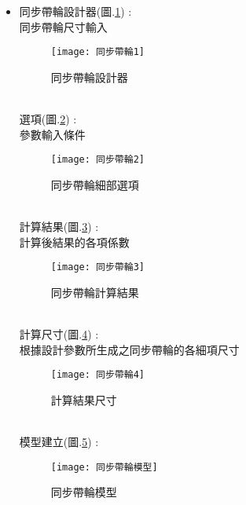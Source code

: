 \begin{itemize}
	\item 同步帶輪設計器(圖.\ref{2.61}) :\\
		同步帶輪尺寸輸入\\
		\begin{figure}[hbt!]
		\begin{center}
		\texttt{[image: 同步帶輪1]}
		\caption{\Large 同步帶輪設計器}\label{2.61}
		\end{center}
		\end{figure}
		\\
		選項(圖.\ref{2.62}) :\\
		參數輸入條件\\
		\begin{figure}[hbt!]
		\begin{center}
		\texttt{[image: 同步帶輪2]}
		\caption{\Large 同步帶輪細部選項}\label{2.62}
		\end{center}
		\end{figure}
		\\
		計算結果(圖.\ref{2.63}) :\\
		計算後結果的各項係數\\
		\begin{figure}[hbt!]
		\begin{center}
		\texttt{[image: 同步帶輪3]}
		\caption{\Large 同步帶輪計算結果}\label{2.63}
		\end{center}
		\end{figure}
		\\
		計算尺寸(圖.\ref{2.64}) :\\
		根據設計參數所生成之同步帶輪的各細項尺寸\\
		\begin{figure}[hbt!]
		\begin{center}
		\texttt{[image: 同步帶輪4]}
		\caption{\Large 計算結果尺寸}\label{2.64}
		\end{center}
		\end{figure}
		\\
		模型建立(圖.\ref{2.65}) :\\
		\begin{figure}[hbt!]
		\begin{center}
		\texttt{[image: 同步帶輪模型]}
		\caption{\Large 同步帶輪模型}\label{2.65}
		\end{center}
		\end{figure}
		\\
		
\newpage
		

\end{itemize}
